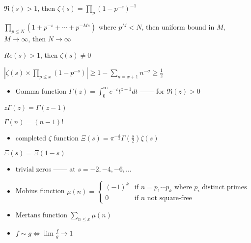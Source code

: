 \begin{prop}
    $\Re(s) > 1$, then $\zeta(s) = \prod_p (1 - p^{-s})^{-1}$
\end{prop}
\begin{pf}
    $\prod_{p \leq N} \left( 1 + p^{-s} + \cdots + p^{-Ms} \right)$ where $p^M < N$, then uniform bound in $M$, $M \rightarrow \infty$, then $N \rightarrow \infty$
\end{pf}

\begin{lemma}
    $Re(s) > 1$, then $\zeta(s) \neq 0$
\end{lemma}
\begin{pf}
    $|\zeta(s) \times \prod_{p\leq x} (1 - p^{-s})| \geq 1 - \sum_{n = x+1} n^{-\sigma} \geq \frac{1}{2}$
\end{pf}

\begin{itemize}
    \item Gamma function $\Gamma(z) = \int_0^\infty e^{-t}t^{z-1} dt$ ------ for $\Re(z) > 0$
\end{itemize}

\begin{fact}
    $z\Gamma(z) = \Gamma(z-1)$
\end{fact}
\begin{fact}
    $\Gamma(n) = (n-1)!$
\end{fact}

\begin{itemize}
    \item completed $\zeta$ function $\Xi(s) = \pi^{-\frac{s}{2}} \Gamma\left(\frac{s}{2}\right) \zeta(s)$
\end{itemize}
\begin{fact}
    $\Xi(s) = \Xi(1 - s)$
\end{fact}

\begin{itemize}
    \item trivial zeros ------ at $s = -2, -4, -6, \dots$
    \item Mobius function $\mu(n) = \begin{cases}
                                        (-1)^k & \text{if } n=p_1\cdots p_{k} \text{ where } p_i \text{ distinct primes}\\
                                        0 & \text{if } n \text{ not square-free}
    \end{cases}$
    \item Mertans function $\sum_{n \leq x} \mu(n)$
    \item $f \sim g \iff \lim \frac{f}{g} \rightarrow 1$
\end{itemize}

